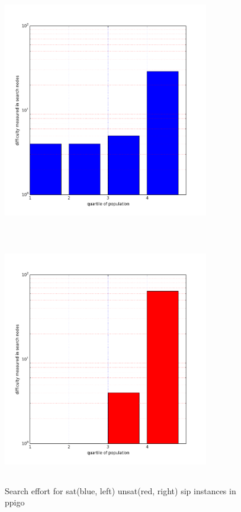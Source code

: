 \documentclass{l4proj}
\begin{document}
\begin{figure}
\centering
\begin{minipage}[t]{.5\textwidth}
  \centering
  \includegraphics[height=11cm,width=9cm]{images/plots/ppigoSAT.png}
\end{minipage}%
\begin{minipage}[t]{.5\textwidth}
  \centering
  \includegraphics[height=11cm,width=9cm]{images/plots/ppigoUNSAT.png}
\end{minipage}
\caption{Search effort for \gls{sat}(blue, left) \gls{unsat}(red, right) \gls{sip} instances in ppigo}
\label{fig:ppigoSatUnsat}
\end{figure}
\end{document}

